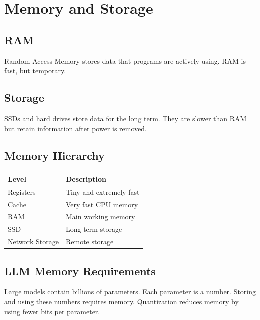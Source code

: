 
\chapter{Memory and Storage}
\label{chap:memory-and-storage}


\section{RAM}
Random Access Memory stores data that programs are actively using. RAM is fast, but temporary.

\section{Storage}
SSDs and hard drives store data for the long term. They are slower than RAM but retain information after power is removed.

\section{Memory Hierarchy}
\begin{center}\begin{tabular}{ll}\toprule Level & Description\\\midrule Registers & Tiny and extremely fast\\ Cache & Very fast CPU memory\\ RAM & Main working memory\\ SSD & Long-term storage\\ Network Storage & Remote storage\\\bottomrule\end{tabular}\end{center}

\section{LLM Memory Requirements}
Large models contain billions of parameters. Each parameter is a number. Storing and using these numbers requires memory. Quantization reduces memory by using fewer bits per parameter.

